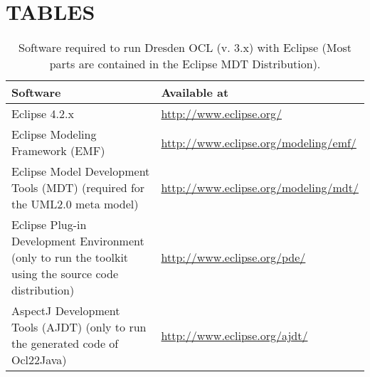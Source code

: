 \cleardoublepage
{}
{}
\chapter*{TABLES}

\begin{table}[h]
\begin{tabular}{|p{7cm}|p{7cm}|}
    \hline
    \textbf{Software} & \textbf{Available at} \\
    \hline
    Eclipse 4.2.x & \url{http://www.eclipse.org/} \\
    \hline
    Eclipse Modeling Framework (EMF) & \url{http://www.eclipse.org/modeling/emf/} \\
    \hline
    Eclipse Model Development Tools (MDT) 
    \newline\footnotesize(required for the UML2.0 meta model) &
    \url{http://www.eclipse.org/modeling/mdt/} \\
    \hline
    Eclipse Plug-in Development Environment 
    \newline\footnotesize(only to run the toolkit using the source code
    distribution) & \url{http://www.eclipse.org/pde/} \\
    \hline
    AspectJ Development Tools (AJDT) 
    \newline\footnotesize(only to run the generated code of Ocl22Java) &
    \url{http://www.eclipse.org/ajdt/} \\
    \hline
\end{tabular}
\caption{Software required to run Dresden OCL (v. 3.x) with Eclipse \newline(Most parts are con\-tained in the Eclipse MDT Distribution).}
\label{tab:software}
\end{table}


